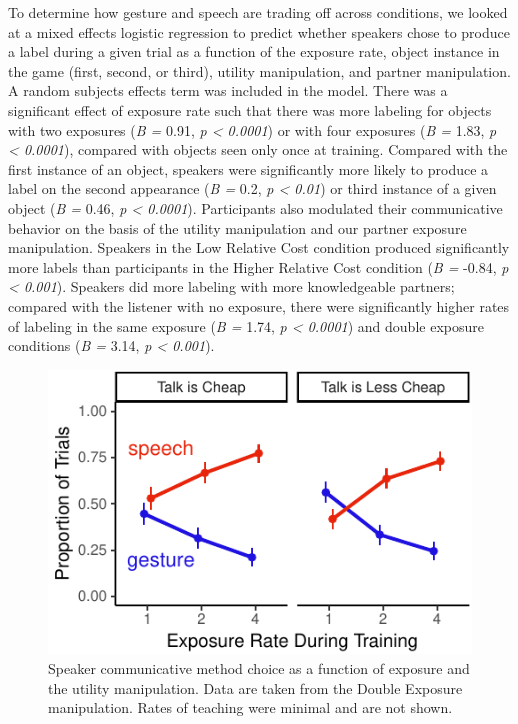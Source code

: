 \documentclass[10pt, letterpaper]{article}
\newenvironment{CodeChunk}{}{}
\begin{document}
To determine how gesture and speech are trading off across conditions,
we looked at a mixed effects logistic regression to predict whether
speakers chose to produce a label during a given trial as a function of
the exposure rate, object instance in the game (first, second, or
third), utility manipulation, and partner manipulation. A random
subjects effects term was included in the model. There was a significant
effect of exposure rate such that there was more labeling for objects
with two exposures (\emph{B =} 0.91, \emph{p \textless{} 0.0001}) or
with four exposures (\emph{B =} 1.83, \emph{p \textless{} 0.0001}),
compared with objects seen only once at training. Compared with the
first instance of an object, speakers were significantly more likely to
produce a label on the second appearance (\emph{B =} 0.2, \emph{p
\textless{} 0.01}) or third instance of a given object (\emph{B =} 0.46,
\emph{p \textless{} 0.0001}). Participants also modulated their
communicative behavior on the basis of the utility manipulation and our
partner exposure manipulation. Speakers in the Low Relative Cost
condition produced significantly more labels than participants in the
Higher Relative Cost condition (\emph{B =} -0.84, \emph{p \textless{}
0.001}). Speakers did more labeling with more knowledgeable partners;
compared with the listener with no exposure, there were significantly
higher rates of labeling in the same exposure (\emph{B =} 1.74, \emph{p
\textless{} 0.0001}) and double exposure conditions (\emph{B =} 3.14,
\emph{p \textless{} 0.001}).

\begin{CodeChunk}
\begin{figure}[tb]

{\centering \includegraphics{figs/exp_speech_gesture-1} 

}

\caption[Speaker communicative method choice as a function of exposure and the utility manipulation]{Speaker communicative method choice as a function of exposure and the utility manipulation. Data are taken from the Double Exposure manipulation. Rates of teaching were minimal and are not shown.}\label{fig:exp_speech_gesture}
\end{figure}
\end{CodeChunk}
\end{document}
